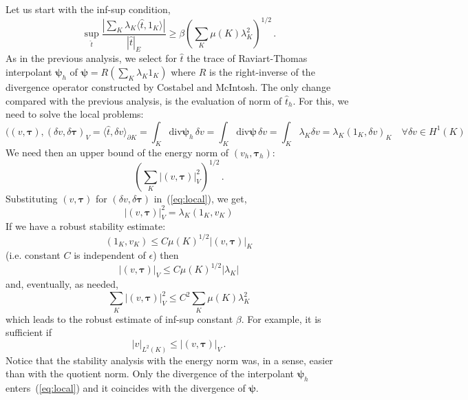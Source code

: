 \documentclass[letterpaper]{article}
\def\bftau{\boldsymbol\tau}
\newcommand{\LRp}[1]{\left( #1 \right)}
\newcommand{\ptl}{{\partial}}
\newcommand{\bfpsi}{\boldsymbol\psi}
\begin{document}
Let us start with the inf-sup condition,
\begin{equation}
\sup_{\hat{t}} \frac{| \sum_K \lambda_K \langle \hat{t},1_K \rangle |}{| \hat{t} |_E}
\geq  \beta \LRp{\sum_K \mu(K) \lambda_K^2}^{1/2}\,.
\end{equation}
As in the previous analysis, we select for $\hat{t}$ the trace of Raviart-Thomas
interpolant $\bfpsi_h$ of $\bfpsi = R (\sum_K \lambda_K 1_K)$ where $R$ is the right-inverse
of the divergence operator constructed by Costabel and McIntosh. The only change compared
with the previous analysis, is the evaluation of norm of $\hat{t}_h$. For this, we need
to solve the local problems:
\begin{equation}
((v,\bftau), (\delta v, \delta \bftau)_V = \langle \hat{t}, \delta v \rangle_{\ptl K}
= \int_K \text{div} \bfpsi_h \, \delta v = \int_K \text{div} \bfpsi \, \delta v = \int_K \lambda_K \delta v
= \lambda_K (1_K,\delta v)_K  \quad \forall \delta v \in H^1(K)
\label{eq:local}
\end{equation}
We need then an upper bound of the energy norm of $(v_h,\bftau_h)$:
$$
\LRp{\sum_K | (v,\bftau) |_V^2}^{1/2}\,.
$$
Substituting $(v,\bftau)$ for $(\delta v,\delta\bftau)$ in~(\ref{eq:local}), we get,
\begin{equation}
| (v,\bftau) |_V^2 = \lambda_K (1_K, v_K)
\end{equation}
If we have a robust stability estimate:
\begin{equation}
(1_K, v_K) \leq C \mu(K)^{1/2} | (v,\bftau) |_K
\end{equation}
(i.e. constant $C$ is independent of $\epsilon$) then
\begin{equation}
|  (v,\bftau) |_V \leq C \mu(K)^{1/2} | \lambda_K |
\end{equation}
and, eventually, as needed,
\begin{equation}
\sum_K | (v,\bftau) |_V^2  \leq C^2 \sum_K \mu(K) \lambda_K^2
\end{equation}
which leads to the robust estimate of inf-sup constant $\beta$. For example, it is sufficient if
\begin{equation}
| v |_{L^2(K)} \leq | (v,\bftau) |_V \, .
\label{eq:robust_est1}
\end{equation}
Notice that the stability analysis with the energy norm was, in a sense, easier than
with the quotient norm. Only the divergence of the interpolant $\bfpsi_h$ enters~(\ref{eq:local})
and it coincides with the divergence of $\bfpsi$.
\end{document}
